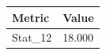 \begin{tabular}{ll}
\toprule
Metric & Value \\
\midrule
Stat\_12 & 18.000 \\
\bottomrule
\end{tabular}